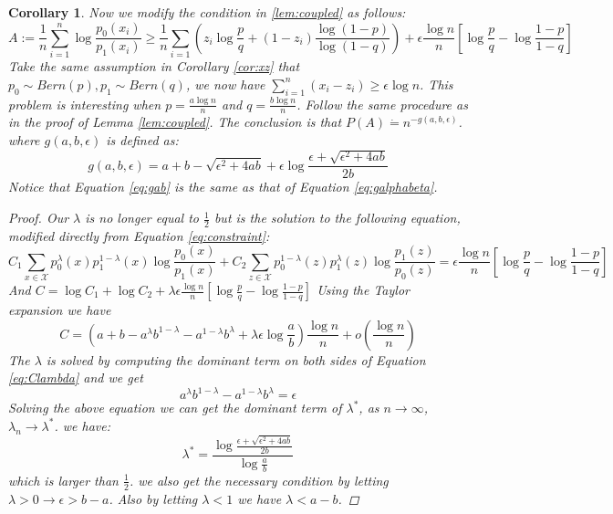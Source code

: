 \documentclass{article}
\newtheorem{corollary}{Corollary}
\begin{document}
\begin{corollary}\label{cor:decrease}
	Now we modify the condition in \ref{lem:coupled} as follows:
	$$
	A := \frac{1}{n}\sum_{i=1}^n \log \frac{p_0(x_i)}{p_1(x_i)} \geq \frac{1}{n} \sum_{i=1}(z_i \log\frac{p}{q} +(1-z_i) \frac{\log(1-p)}{\log(1-q)}) + \epsilon\frac{\log n }{n} [\log \frac{p}{q} - \log \frac{1-p}{1-q}]
	$$
	Take the same assumption in Corollary \ref{cor:xz} that
	$p_0 \sim Bern(p), p_1 \sim Bern(q)$, we now have $\sum_{i=1}^n (x_i - z_i) \geq \epsilon \log n$.
	This problem is interesting when
	$ p = \frac{a \log n }{n} $ and $ q = \frac{b \log n }{n}$. Follow the same procedure as
	in the proof of Lemma \ref{lem:coupled}. The conclusion is that $P(A) \dot{=} n^{-g(a,b,\epsilon)}$.
	where $g(a,b,\epsilon)$ is defined as:
	\begin{equation}\label{eq:gab}
	g(a,b,\epsilon) = a + b - \sqrt{\epsilon^2 + 4ab} + \epsilon \log \frac{\epsilon + \sqrt{\epsilon^2 + 4ab}}{2b}
	\end{equation}
	Notice that Equation \eqref{eq:gab} is the same as that of Equation \eqref{eq:galphabeta}.
	\begin{proof}
	Our $\lambda$ is no longer equal to $\frac{1}{2}$ but is the solution to the following equation, modified directly from Equation \eqref{eq:constraint}:
	\begin{equation}\label{eq:Clambda}
	C_1 \sum_{x\in \mathcal{X}} p_0^{\lambda}(x)p_1^{1-\lambda}(x)\log\frac{p_0(x)}{p_1(x)} + C_2 \sum_{z\in \mathcal{X}} p_0^{1-\lambda}(z)p_1^{\lambda}(z)\log\frac{p_1(z)}{p_0(z)}= \epsilon\frac{\log n }{n} [\log \frac{p}{q} - \log \frac{1-p}{1-q}]
	\end{equation}
	And $C= \log C_1 + \log C_2 + \lambda \epsilon\frac{\log n }{n} [\log \frac{p}{q} - \log \frac{1-p}{1-q}]$
	Using the Taylor expansion we have
	$$
	C = (a + b - a^{\lambda}b^{1-\lambda} - a^{1-\lambda}b^{\lambda} + \lambda \epsilon \log\frac{a}{b}) \frac{\log n }{n}
	+ o(\frac{\log n}{n})
	$$
	The $\lambda$ is solved by computing the dominant term on both sides of Equation \eqref{eq:Clambda} and we get
	\begin{equation}
	 a^{\lambda}b^{1-\lambda} - a^{1-\lambda}b^{\lambda} = \epsilon
	\end{equation}
	Solving the above equation we can get the dominant term of $\lambda^*$, as $n\to \infty$, $\lambda_n \to \lambda^*$.
	we have:
	\begin{equation}
	\lambda^*= \frac{
				\log \frac{ 
			\epsilon + \sqrt{\epsilon^2 + 4 ab }	
			} { 2b}
	}
	{\log \frac{a}{b}}
	\end{equation}
	which is larger than $\frac{1}{2}$. we also get the necessary condition by letting $\lambda > 0 \rightarrow \epsilon > b - a$.  Also by letting $\lambda < 1$ we have $\lambda < a - b$.
	\end{proof}
\end{corollary}
\end{document}
